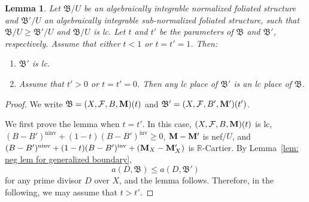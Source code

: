 \documentclass[11pt,reqno]{amsart}
\numberwithin{equation}{section}
\newcommand{\Mm}{{\bf{M}}}
\newcommand{\ninv}{\operatorname{ninv}}
\newcommand{\inv}{\operatorname{inv}}
\newcommand{\Bb}{{\mathfrak{B}}}
\newcommand{\Ff}{\mathcal{F}}
\newtheorem{lem}[thm]{Lemma}
\theoremstyle{definition}
\begin{document}
\begin{lem}\label{lem: lc preserved under inequality}
Let $\Bb/U$ be an algebraically integrable normalized foliated structure and $\Bb'/U$ an algebraically integrable sub-normalized foliated structure, such that $\Bb/U\geq\Bb'/U$ and $\Bb/U$ is lc. Let $t$ and $t'$ be the parameters of $\Bb$ and $\Bb'$, respectively. Assume that either $t<1$ or $t=t'=1$. Then:
\begin{enumerate}
    \item $\Bb'$ is lc.
    \item Assume that $t'>0$ or $t=t'=0$. Then any lc place of $\Bb'$ is an lc place of $\Bb$.
\end{enumerate}
\end{lem}
\begin{proof}
We write $\Bb=(X,\Ff,B,\Mm)(t)$ and $\Bb'=(X,\Ff,B',\Mm')(t')$. 

We first prove the lemma when $t=t'$. In this case, $(X,\Ff,B,\Mm)(t)$ is lc, $(B-B')^{\ninv}+(1-t)(B-B')^{\inv}\geq 0$, $\Mm-\Mm'$ is nef$/U$, and $(B-B')^{\ninv}+(1-t)(B-B')^{\inv}+(\Mm_X-\Mm'_X)$ is $\mathbb R$-Cartier. By Lemma~\ref{lem: neg lem for generalized boundary},
$$a(D,\Bb)\leq a(D,\Bb')$$
for any prime divisor $D$ over $X$, and the lemma follows. Therefore, in the following, we may assume that $t>t'$. 


\end{proof}
\end{document}
